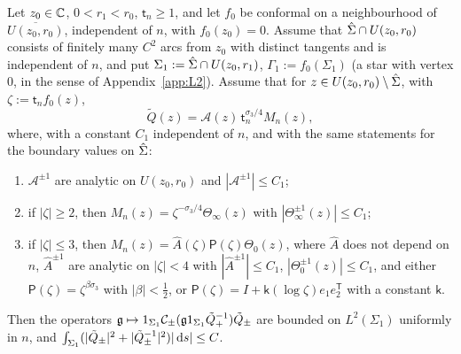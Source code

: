 \begin{lemma}\label{lem:B-block}
Let $z_0\in\mathbb{C}$, $0<r_1<r_0$, $\mathsf t_n\ge1$, and let $f_0$ be conformal on a neighbourhood of $\overline{U(z_0,r_0)}$,
independent of $n$, with $f_0(z_0)=0$. Assume that $\hat\Sigma\cap U(z_0,r_0)$ consists of finitely many $C^2$ arcs from
$z_0$ with distinct tangents and is independent of $n$, and put $\Sigma_1:=\hat\Sigma\cap U(z_0,r_1)$,
$\Gamma_1:=f_0(\Sigma_1)$ (a star with vertex $0$, in the sense of Appendix~\ref{app:L2}). Assume that for $z\in
U(z_0,r_0)\setminus\hat\Sigma$, with $\zeta:=\mathsf t_nf_0(z)$,
\[
  \tilde Q(z)=\mathcal A(z)\,\mathsf t_n^{\sigma_3/4}M_n(z),
\]
where, with a constant $C_1$ independent of $n$, and with the same statements for the boundary values on $\hat\Sigma$:
\begin{enumerate}
\item[(B1)] $\mathcal A^{\pm1}$ are analytic on $U(z_0,r_0)$ and $|\mathcal A^{\pm1}|\le C_1$;
\item[(B2)] if $|\zeta|\ge2$, then $M_n(z)=\zeta^{-\sigma_3/4}\Theta_\infty(z)$ with $|\Theta_\infty^{\pm1}(z)|\le C_1$;
\item[(B3)] if $|\zeta|\le3$, then $M_n(z)=\hat A(\zeta)\mathsf P(\zeta)\Theta_0(z)$, where $\hat A$ does not depend on $n$,
  $\hat A^{\pm1}$ are analytic on $|\zeta|<4$ with $|\hat A^{\pm1}|\le C_1$, $|\Theta_0^{\pm1}(z)|\le C_1$, and either
  $\mathsf P(\zeta)=\zeta^{\beta\sigma_3}$ with $|\beta|<\frac12$, or $\mathsf P(\zeta)=I+\mathsf k(\log\zeta)e_1e_2^{\mathsf T}$ with
  a constant $\mathsf k$.
\end{enumerate}
Then the operators $\mathfrak g\mapsto1_{\Sigma_1}\mathcal{C}_\pm(\mathfrak g1_{\Sigma_1}\tilde Q_+^{-1})\tilde Q_\pm$ are bounded on
$L^2(\Sigma_1)$ uniformly in $n$, and $\int_{\Sigma_1}(|\tilde Q_\pm|^2+|\tilde Q_\pm^{-1}|^2)|\,\mathrm{d} s|\le C$.
\end{lemma}

